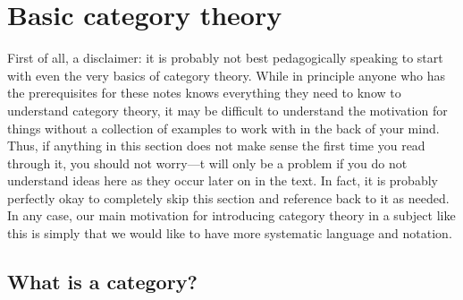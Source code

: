 \section{Basic category theory}

First of all, a disclaimer:  it is probably not best pedagogically speaking to start with even the very basics of category theory.  While in principle anyone who has the prerequisites for these notes knows everything they need to know to understand category theory, it may be difficult to understand the motivation for things without a collection of examples to work with in the back of your mind.  Thus, if anything in this section does not make sense the first time you read through it, you should not worry---t will only be a problem if you do not understand ideas here as they occur later on in the text.  In fact, it is probably perfectly okay to completely skip this section and reference back to it as needed.  In any case, our main motivation for introducing category theory in a subject like this is simply that we would like to have more systematic language and notation.

\subsection{What is a category?}

